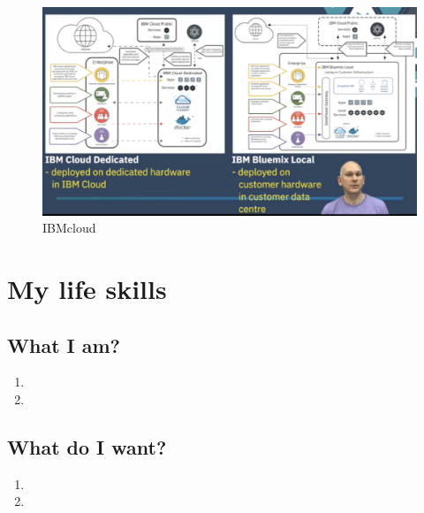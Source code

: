 \documentclass[11pt, twoside]{article}   	%
\begin{document}
\begin{enumerate}
\begin{enumerate}
     \begin{figure}
    [!htb]\centering
    \includegraphics[width=5in]{IBMcloud.png}%
    \caption{IBMcloud}
  \label{fig:phase}
  \end{figure}


    \end {enumerate}
\end {enumerate}



\bigskip
\section{My life skills}
\subsection{What I am?}
\renewcommand{\labelenumii}{\alph{enumii}}
\begin{enumerate}
\item 
\item 
\end {enumerate}
\subsection{What do I want?}
\begin{enumerate}
\item 
\item 
\end {enumerate}
\end{document}
